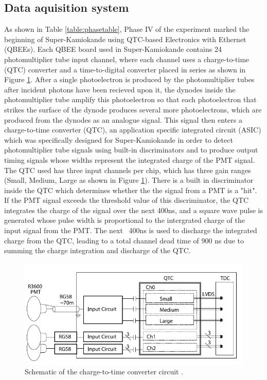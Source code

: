 \subsection{Data aquisition system}

As shown in Table \ref{table:phasetable}, Phase IV of the experiment marked the beginning of Super-Kamiokande using QTC-based Electronics with Ethernet (QBEEs). Each QBEE board used in Super-Kamiokande contains 24 photomultiplier tube input channel, where each channel uses a charge-to-time (QTC) converter and a time-to-digital converter placed in series as shown in Figure \ref{fig:superkdaq}. After a single photoelectron is produced by the photomultiplier tubes after incident photons have been recieved upon it, the dynodes inside the photomultiplier tube amplify this photoelectron so that each photoelectron that strikes the surface of the dynode produces several more photoelectrons, which are produced from the dynodes as an analogue signal. This signal then enters a charge-to-time converter (QTC), an application specific integrated circuit (ASIC) which was specifically designed for Super-Kamiokande in order to detect photomultiplier tube signals using built-in discriminators and to produce output timing signals whose widths represent the integrated charge of the PMT signal. The QTC used has three input channels per chip, which has three gain ranges (Small, Medium, Large as shown in Figure \ref{fig:superkdaq}). There is a built in discriminator inside the QTC which determines whether the the signal from a PMT is a "hit". If the PMT signal exceeds the threshold value of this discriminator, the QTC integrates the charge of the signal over the next 400ns, and a square wave pulse is generated whose pulse width is proportional to the intergrated charge of the input signal from the PMT. The next ~400ns is used to discharge the integrated charge from the QTC, leading to a total channel dead time of 900 ns due to summing the charge integration and discharge of the QTC. 
\newline

\begin{figure}
    \includegraphics[width=\textwidth]{Figures/superk_daq.png}
\caption{Schematic of the charge-to-time converter circuit \cite{nishinoHighspeedChargetotimeConverter2009a}.}
    \label{fig:superkdaq}
\end{figure}

